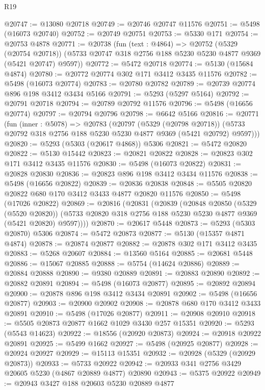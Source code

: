 \begin{lexlean}{R19}
\begin{coremodule}
@20747 := @13080 @20718
@20749 := @20746 @20747 @11576
@20751 := @5498 (@16073 @20740)
@20752 := @20749 @20751
@20753 := @5330 @171
@20754 := @20753 @4878
@20771 := @20738
    (fun (text : @4864) =>
    @20752
      (@5329 (@20754 @20718))
      (@5733 @20747 @318 @2756 @188 @5230 @5230 @4877 @9369 (@5421 @20747) @9597))
@20772 := @5472 @20718
@20774 := @5130 (@15684 @4874)
@20780 := @20772 @20774 @302 @171 @3412 @3435 @11576
@20782 := @5498 (@16073 @20774)
@20783 := @20780 @20782
@20789 := @20739 @20774 @896 @198 @3412 @3434 @5166
@20791 := @5293 (@5297 @5164)
@20792 := @20791 @20718
@20794 := @20789 @20792 @11576
@20796 := @5498 (@16656 @20774)
@20797 := @20794 @20796
@20798 := @6642 @5166
@20816 := @20771
    (fun (inner : @5078) =>
    @20783
      (@20797
        (@5329 (@20798 @20718))
        (@5733 @20792 @318 @2756 @188 @5230 @5230 @4877 @9369 (@5421 @20792) @9597)))
@20820 := @5293 (@5303 (@20617 @4868)) @5306
@20821 := @5472 @20820
@20822 := @5130 @15442
@20823 := @20821 @20822
@20828 := @20823 @302 @171 @3412 @3435 @11576
@20830 := @5498 (@16073 @20822)
@20831 := @20828 @20830
@20836 := @20823 @896 @198 @3412 @3434 @11576
@20838 := @5498 (@16656 @20822)
@20839 := @20836 @20838
@20848 := @5505 @20820 @20822 @680 @170 @3412 @3433 @4877 @20820 @11576
@20850 := @5498 (@17026 @20822)
@20869 := @20816
    (@20831
      (@20839
        (@20848
          @20850
          (@5329 (@5520 @20820))
          (@5733 @20820 @318 @2756 @188 @5230 @5230 @4877 @9369 (@5421 @20820) @9597))))
@20870 := @20617 @5448
@20873 := @5293 (@5303 @20870) @5306
@20874 := @5472 @20873
@20877 := @5130 (@15357 @4871 @4874)
@20878 := @20874 @20877
@20882 := @20878 @302 @171 @3412 @3435
@20883 := @5268 @20607
@20884 := @13560 @5164
@20885 := @20681 @5448
@20886 := @15067 @20885
@20888 := @5754 (@14624 @20886)
@20889 := @20884 @20888
@20890 := @9380 @20889
@20891 := @20883 @20890
@20892 := @20882 @20891
@20894 := @5498 (@16073 @20877)
@20895 := @20892 @20894
@20900 := @20878 @896 @198 @3412 @3434 @20891
@20902 := @5498 (@16656 @20877)
@20903 := @20900 @20902
@20908 := @20878 @680 @170 @3412 @3433 @20891
@20910 := @5498 (@17026 @20877)
@20911 := @20908 @20910
@20918 := @5505 @20873 @20877 @1662 @1029 @3430 @257 @15351
@20920 := @5293 (@5543 @14623)
@20922 := @18556 (@20920 @20873)
@20924 := @20918 @20922 @20891
@20925 := @5499 @1662
@20927 := @5498 (@20925 @20877)
@20928 := @20924 @20927
@20929 := @15113 @15351
@20932 := @20928 (@5329 (@20929 @20873))
@20933 := @5733 @20922
@20942 := @20933 @341 @2756 @3429 @20605 @5230 (@4867 @20889 @4877) @20890
@20943 := @5375 @20922
@20949 := @20943 @3427 @188 @20603 @5230 @20889 @4877

\end{coremodule}
\end{lexlean}
